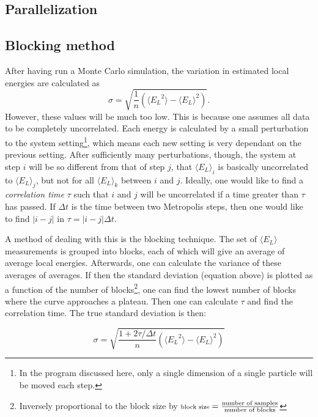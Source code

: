 \documentclass[english, a4paper]{article}
\newcommand\lr[1]{\left(#1\right)}
\begin{document}
	\subsection{Parallelization}
	
	
	\subsection{Blocking method} \label{blockingTheory}
	
	After having run a Monte Carlo simulation, the variation in estimated local energies are calculated as
	\begin{equation}
		\sigma = \sqrt{\frac{1}{n}\lr{\langle {E_L}^2 \rangle - \langle E_L \rangle^2}}. \label{uncorelatedVariance}
	\end{equation} 
	However, these values will be much too low.
	This is because one assumes all data to be completely uncorrelated. Each energy is calculated by a small perturbation to the system setting\footnote{In the program discussed here, only a single dimension of a single particle will be moved each step.}, which means each new setting is very dependant on the previous setting. After sufficiently many perturbations, though, the system at step $i$ will be so different from that of step $j$, that $\langle E_L\rangle_i$ is basically uncorrelated to  $\langle E_L\rangle_j$, but not for all $\langle E_L\rangle_k$ between $i$ and $j$. Ideally, one would like to find a \emph{correlation time} $\tau$ such that $i$ and $j$ will be uncorrelated if a time greater than $\tau$ has passed. If $\Delta t$ is the time between two Metropolis steps, then one would like to find $|i-j|$ in $\tau = |i-j|\Delta t$.
	
	A method of dealing with this is the blocking technique. The set of $\langle E_L\rangle$ measurements is grouped into blocks, each of which will give an average of average local energies. Afterwards, one can calculate the variance of these averages of averages. If then the standard deviation (equation above) is plotted as a function of the number of blocks\footnote{Inversely proportional to the block size by $\text{\scriptsize block size} = \frac{\text{number of samples}}{\text{number of blocks}}$}, one can find the lowest number of blocks where the curve approaches a plateau. Then one can calculate $\tau$ and find the correlation time. The true standard deviation is then:
	
	\begin{equation}
		\sigma=\sqrt{\frac{1+2\tau/\Delta t}{n}\left(\langle {E_L}^2\rangle-\langle E_L\rangle^2\right)}
	\end{equation}
	
\end{document}
